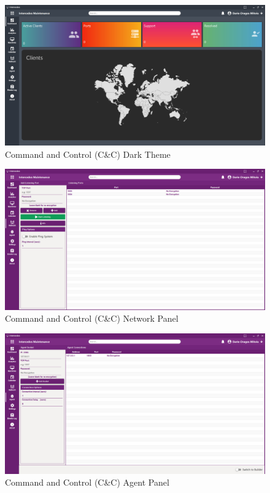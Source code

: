 \begin{figure}[h]
    \centering
    \includegraphics[width=1.0\textwidth]{images/dashboard-dark-theme.pdf}
    \captionsetup{justification=centering}
    \caption[Command and Control (C\&C) Dark Theme]{Command and Control (C\&C) Dark Theme}
    \label{fig:command-dark-theme}
\end{figure}

\newpage

\begin{figure}[h]
    \centering
    \includegraphics[width=1.0\textwidth]{images/network-panel-light-theme.pdf}
    \captionsetup{justification=centering}
    \caption[Command and Control (C\&C) Network Panel]{Command and Control (C\&C) Network Panel}
    \label{fig:command-network}
\end{figure}

\begin{figure}[h]
    \centering
    \includegraphics[width=1.0\textwidth]{images/agent-panel-light-theme.pdf}
    \captionsetup{justification=centering}
    \caption[Command and Control (C\&C) Agent Panel]{Command and Control (C\&C) Agent Panel}
    \label{fig:command-agent}
\end{figure}

